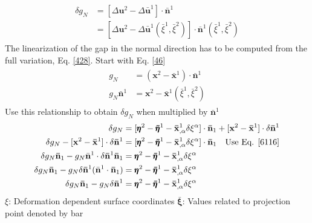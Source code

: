 \documentclass[12pt,3p]{article}
\numberwithin{equation}{section}
\begin{document}
\begin{align}\label{6115}
\begin{split}
\delta g_N &= [\Delta \mathbf{u}^2 - \Delta \mathbf{\bar{u}}^1] \cdot \mathbf{\bar{n}}^1 \\
		&=  [\Delta \mathbf{u}^2 - \Delta \mathbf{\bar{u}}^1 (\bar{\xi}^1, \bar{\xi}^2)] \cdot \mathbf{\bar{n}}^1 (\bar{\xi}^1, \bar{\xi}^2)
\end{split}
\end{align}
The linearization of the gap in the normal direction has to be computed from the full variation, Eq. \ref{428}. 
Start with Eq. \ref{46}
\begin{align}\label{6116}
\begin{split}
g_N &= (\mathbf{x}^2 - \mathbf{\bar{x}}^1) \cdot \bar{\mathbf{n}}^1 \\
g_N \bar{\mathbf{n}}^1 &= \mathbf{x}^2 - \mathbf{\bar{x}}^1 (\bar{\xi}^1, \bar{\xi}^2) 
\end{split}
\end{align}
Use this relationship to obtain $\delta g_N$ when multiplied by $\mathbf{\bar{n}}^1$
\begin{align}
\begin{split}
\delta g_N &= [ \pmb{\eta}^2 - \pmb{\bar{\eta}}^1 - \mathbf{\bar{x}}^1_{,\alpha} \delta \xi^\alpha ] \cdot \mathbf{\bar{n}}_1 + [\mathbf{x}^2 - \mathbf{\bar{x}}^1] \cdot \delta \mathbf{\bar{n}}^1 \\
\delta g_N - [\mathbf{x}^2 - \mathbf{\bar{x}}^1] \cdot \delta \mathbf{\bar{n}}^1 &= [ \pmb{\eta}^2 - \pmb{\bar{\eta}}^1 - \mathbf{\bar{x}}^1_{,\alpha} \delta \xi^\alpha ] \cdot \mathbf{\bar{n}}_1 \quad \text{Use Eq. \ref{6116}}\\
\delta g_N \mathbf{\bar{n}}_1 - g_N \bar{\mathbf{n}}^1 \cdot \delta \mathbf{\bar{n}}^1  \mathbf{\bar{n}}_1 &= \pmb{\eta}^2 - \pmb{\bar{\eta}}^1 - \mathbf{\bar{x}}^1_{,\alpha} \delta \xi^\alpha \\
\delta g_N \mathbf{\bar{n}}_1 - g_N \delta \mathbf{\bar{n}}^1 (\bar{\mathbf{n}}^1 \cdot \mathbf{\bar{n}}_1) &= \pmb{\eta}^2 - \pmb{\bar{\eta}}^1 - \mathbf{\bar{x}}^1_{,\alpha} \delta \xi^\alpha \\
\delta g_N \mathbf{\bar{n}}_1 - g_N \delta \mathbf{\bar{n}}^1 &= \pmb{\eta}^2 - \pmb{\bar{\eta}}^1 - \mathbf{\bar{x}}^1_{,\alpha} \delta \xi^\alpha
\end{split}
\end{align}
$\xi$: Deformation dependent surface coordinates 
$\pmb{\bar{\xi}}$: Values related to projection point denoted by bar \\



\begin{align}
\begin{split}
\end{split}
\end{align}

\begin{align}
\begin{split}
\end{split}
\end{align}
\end{document}
